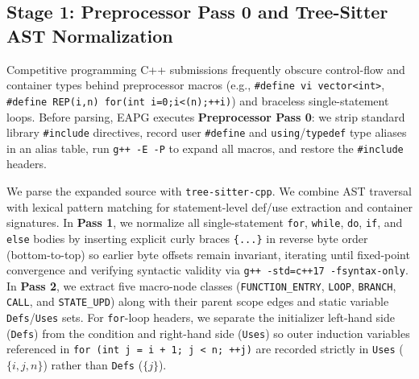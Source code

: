 \documentclass[10pt,conference]{IEEEtran}
\begin{document}
\subsection{Stage 1: Preprocessor Pass 0 and Tree-Sitter AST Normalization}
Competitive programming C++ submissions frequently obscure control-flow and container types behind preprocessor macros (e.g., \texttt{\#define vi vector<int>}, \texttt{\#define REP(i,n) for(int i=0;i<(n);++i)}) and braceless single-statement loops. Before parsing, EAPG executes \textbf{Preprocessor Pass 0}: we strip standard library \texttt{\#include} directives, record user \texttt{\#define} and \texttt{using}/\texttt{typedef} type aliases in an alias table, run \texttt{g++ -E -P} to expand all macros, and restore the \texttt{\#include} headers.

We parse the expanded source with \texttt{tree-sitter-cpp}. We combine AST traversal with lexical pattern matching for statement-level def/use extraction and container signatures. In \textbf{Pass 1}, we normalize all single-statement \texttt{for}, \texttt{while}, \texttt{do}, \texttt{if}, and \texttt{else} bodies by inserting explicit curly braces \texttt{\{...\}} in reverse byte order (bottom-to-top) so earlier byte offsets remain invariant, iterating until fixed-point convergence and verifying syntactic validity via \texttt{g++ -std=c++17 -fsyntax-only}. In \textbf{Pass 2}, we extract five macro-node classes (\texttt{FUNCTION\_ENTRY}, \texttt{LOOP}, \texttt{BRANCH}, \texttt{CALL}, and \texttt{STATE\_UPD}) along with their parent scope edges and static variable \texttt{Defs}/\texttt{Uses} sets. For \texttt{for}-loop headers, we separate the initializer left-hand side (\texttt{Defs}) from the condition and right-hand side (\texttt{Uses}) so outer induction variables referenced in \texttt{for (int j = i + 1; j < n; ++j)} are recorded strictly in \texttt{Uses} ($\{i,j,n\}$) rather than \texttt{Defs} ($\{j\}$).
\end{document}
